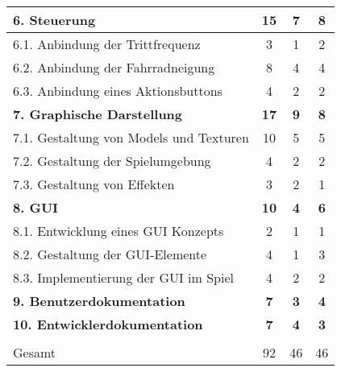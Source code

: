 \begin{tabularx}{\textwidth}{|X|c|c|c|}
\textbf{6. Steuerung} & \textbf{15} & \textbf{7} & \textbf{8} \\ \hline
6.1. Anbindung der Trittfrequenz & 3 & 1 & 2 \\ \hline
6.2. Anbindung der Fahrradneigung & 8 & 4 & 4 \\ \hline
6.3. Anbindung eines Aktionsbuttons & 4 & 2 & 2 \\ \hline
\textbf{7. Graphische Darstellung} & \textbf{17} & \textbf{9} & \textbf{8} \\ \hline
7.1. Gestaltung von Models und Texturen & 10 & 5 & 5 \\ \hline
7.2. Gestaltung der Spielumgebung & 4 & 2 & 2 \\ \hline
7.3. Gestaltung von Effekten & 3 & 2 & 1 \\ \hline
\textbf{8. GUI} & \textbf{10} & \textbf{4} & \textbf{6} \\ \hline
8.1. Entwicklung eines GUI Konzepts & 2 & 1 & 1 \\ \hline
8.2. Gestaltung der GUI-Elemente & 4 & 1 & 3 \\ \hline
8.3. Implementierung der GUI im Spiel & 4 & 2 & 2 \\ \hline
\textbf{9. Benutzerdokumentation} & \textbf{7} & \textbf{3} & \textbf{4} \\ \hline
\textbf{10. Entwicklerdokumentation} & \textbf{7} & \textbf{4} & \textbf{3} \\ \hline
 &  &  &  \\ \hline
Gesamt & 92 & 46 & 46 \\ \hline
\end{tabularx}
